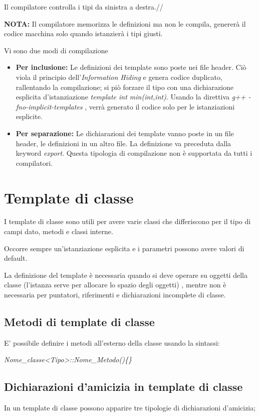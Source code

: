 Il compilatore controlla i tipi da sinistra a destra.//

\textbf{NOTA:} Il compilatore memorizza le definizioni ma non le compila, genererà il codice macchina solo quando istanzierà i tipi giusti.

Vi sono due modi di compilazione

\begin{itemize}
	\item \textbf{Per inclusione:} Le definizioni dei template sono poste nei file header. Ciò viola il principio dell'\textit{Information Hiding} e genera codice duplicato, rallentando la compilazione; si piò forzare il tipo con una dichiarazione esplicita d'istanziazione  \textit{template int min(int,int)}. Usando la direttiva \textit{g++ -fno-implicit-templates} , verrà generato il codice solo per le istanziazioni esplicite.
	\item \textbf{Per separazione:} Le dichiarazioni dei template vanno poste in un file header, le definizioni in un altro file. La definizione va preceduta dalla keyword \textit{export}. Questa tipologia di compilazione non è supportata da tutti i compilatori. 
\end{itemize}

\section{Template di classe}

I template di classe sono utili per avere varie classi che differiscono per il tipo di campi dato, metodi e classi interne.

Occorre sempre un'istanziazione esplicita e i parametri possono avere valori di default.

La definizione del template è necessaria quando si deve operare su oggetti della classe (l'istanza serve per allocare lo spazio degli oggetti) , mentre non è necessaria per puntatori, riferimenti e dichiarazioni incomplete di classe.

\subsection{Metodi di template di classe}

E' possibile definire i metodi all'esterno della classe usando la sintassi:

\textit{Nome\_classe<Tipo>::Nome\_Metodo()\{\}}

\subsection{Dichiarazioni d'amicizia in template di classe}
In un template di classe possono apparire tre tipologie di dichiarazioni d'amicizia;

